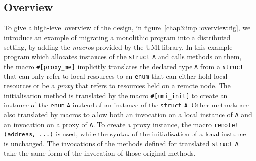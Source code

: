 \subsection{Overview}
\label{chap3:impl:overview}
To give a high-level overview of the design, in figure~\ref{chap3:impl:overview:fig}, we introduce an example of migrating a monolithic program into a distributed setting, by adding the \emph{macro}s provided by the UMI library. In this example program which allocates instances of the \texttt{struct} \texttt{A} and calls methods on them, the macro \texttt{\#[proxy\_me]} implicitly translates the declared type \texttt{A} from a \texttt{struct} that can only refer to local resources to an \texttt{enum} that can either hold local resources or be a \emph{proxy} that refers to resources held on a remote node. The initialisation method is translated by the macro \texttt{\#[umi\_init]} to create an instance of the \texttt{enum} \texttt{A} instead of an instance of the \texttt{struct} \texttt{A}. Other methods are also translated by macros to allow both an invocation on a local instance of \texttt{A} and an invocation on a proxy of \texttt{A}. To create a proxy instance, the macro \texttt{remote!(address, ...)} is used, while the syntax of the initialisation of a local instance is unchanged. The invocations of the methods defined for translated \texttt{struct} \texttt{A} take the same form of the invocation of those original methods.

